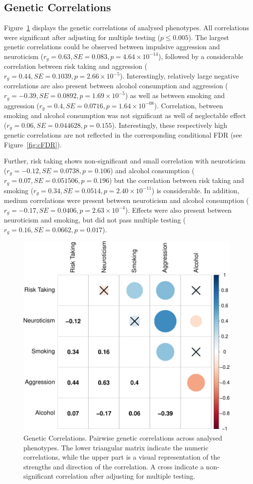 \subsection{Genetic Correlations}
\label{sub:genetic_correlations_internal}

Figure~\ref{fig:gcor} displays the genetic correlations of analysed phenotypes.
All correlations were significant after adjusting for multiple testing ($p\leq0.005$).
The largest genetic correlations could be observed between impulsive aggression and neuroticism ($r_g=0.63, SE=0.083, p=4.64\times 10^{-14}$), 
followed by a considerable correlation between risk taking and aggression ($r_g=0.44, SE=0.1039, p=2.66\times 10^{-5}$).
Interestingly, relatively large negative correlations are also present between alcohol consumption and aggression ($r_g=-0.39, SE=0.0892, p=1.69\times 10^{-5}$)
as well as between smoking and aggression ($r_g=0.4, SE=0.0716, p=1.64\times 10^{-08}$).
Correlation, between smoking and alcohol consumption was not significant as well of neglectable effect ($r_g=0.06, SE=0.044628, p=0.155$).
Interestingly, these respectively high genetic correlations are not reflected in the corresponding conditional FDR (see Figure~\ref{fig:cFDR}).

Further, risk taking shows non-significant and small correlation with neuroticism ($r_g=-0.12, SE=0.0738, p=0.106$) and
alcohol consumption ($r_g=0.07, SE=0.051506, p=0.196$) but the correlation between risk taking and smoking ($r_g=0.34, SE=0.0514, p=2.40\times 10^{-11}$) is considerable.
In addition, medium correlations were present between neuroticism and alcohol consumption ($r_g=-0.17, SE=0.0406, p=2.63\times 10^{-4}$). 
Effects were also present between neuroticism and smoking, but did not pass multiple testing ($r_g=0.16, SE=0.0662, p=0.017$).

\begin{figure}[!h]
	\centering
  \includegraphics[width=0.8\linewidth]{ukb_assoc/figure/genetic_corr/gcorr_plot_circle_full_se.pdf}
  \caption{Genetic Correlations.
    Pairwise genetic correlations across analysed phenotypes.
    The lower triangular matrix indicate the numeric correlations, while the upper part is a visual representation of the strengths and direction of the correlation.
    A cross indicate a non-significant correlation after adjusting for multiple testing.
  }\label{fig:gcor}
\end{figure}

